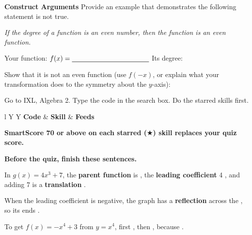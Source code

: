 \newpage
{}

\textbf{Construct Arguments} Provide an example that demonstrates the following statement is not true.

\emph{If the degree of a function is an even number, then the function is an even function.}

Your function: $f(x)=\blank[4cm]$ \quad Its degree: \blank[1.2cm]

Show that it is not an even function (use $f(-x)$, or explain what your transformation does to the symmetry about the $y$-axis):
\lines[3]

Go to IXL, Algebra 2. Type the code in the search box. Do the starred skills first.

\vspace{2pt}
\begin{tabularx}{\textwidth}{l Y Y}
\toprule
\textbf{Code} & \textbf{Skill} & \textbf{Feeds} \\
\midrule
{}
\bottomrule
\end{tabularx}

\vspace{4pt}
\textbf{SmartScore 70 or above on each starred ($\bigstar$) skill replaces your quiz score.}

\vspace{6pt}
\textbf{Before the quiz, finish these sentences.}

In $g(x)=4x^3+7$, the \textbf{parent function} is \blank[2cm], the \textbf{leading coefficient} 4 \blank[3.2cm], and adding 7 is a \textbf{translation} \blank[3.5cm].

When the leading coefficient is negative, the graph has a \textbf{reflection} across the \blank[2cm], so its ends \blank[4.5cm].

To get $f(x)=-x^4+3$ from $y=x^4$, first \blank[4cm], then \blank[4cm], because \blank[5cm].


